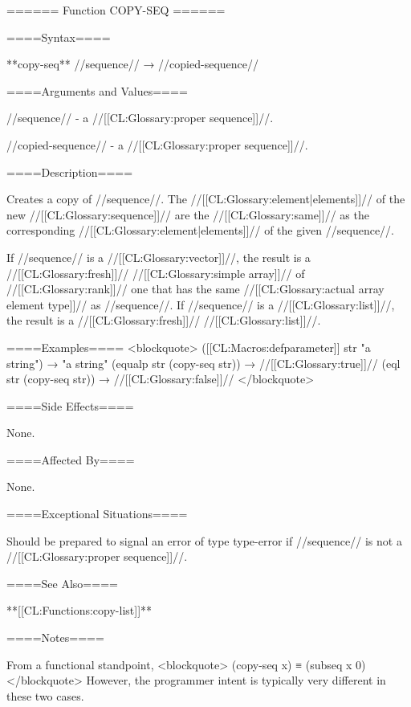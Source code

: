 ====== Function COPY-SEQ ======

====Syntax====

**copy-seq** //sequence// → //copied-sequence//

====Arguments and Values====

//sequence// - a //[[CL:Glossary:proper sequence]]//.

//copied-sequence// - a //[[CL:Glossary:proper sequence]]//.

====Description====

Creates a copy of //sequence//. The //[[CL:Glossary:element|elements]]// of the new //[[CL:Glossary:sequence]]// are the //[[CL:Glossary:same]]// as the corresponding //[[CL:Glossary:element|elements]]// of the given //sequence//.

If //sequence// is a //[[CL:Glossary:vector]]//, the result is a //[[CL:Glossary:fresh]]// //[[CL:Glossary:simple array]]// of //[[CL:Glossary:rank]]// one that has the same //[[CL:Glossary:actual array element type]]// as //sequence//. If //sequence// is a //[[CL:Glossary:list]]//, the result is a //[[CL:Glossary:fresh]]// //[[CL:Glossary:list]]//.

====Examples==== <blockquote> ([[CL:Macros:defparameter]] str "a string") → "a string" (equalp str (copy-seq str)) → //[[CL:Glossary:true]]// (eql str (copy-seq str)) → //[[CL:Glossary:false]]// </blockquote>

====Side Effects====

None.

====Affected By====

None.

====Exceptional Situations====

Should be prepared to signal an error of type type-error if //sequence// is not a //[[CL:Glossary:proper sequence]]//.

====See Also====

**[[CL:Functions:copy-list]]**

====Notes====

From a functional standpoint, <blockquote> (copy-seq x) ≡ (subseq x 0) </blockquote> However, the programmer intent is typically very different in these two cases.

